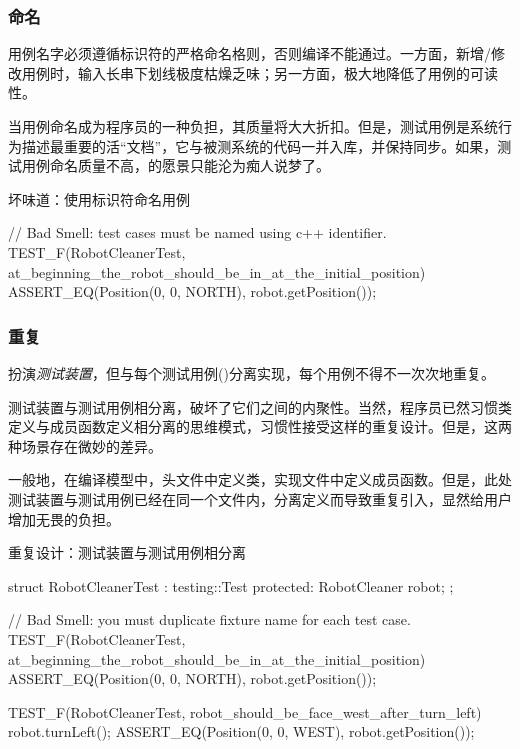 \begin{content}
\subsubsection{命名}

用例名字必须遵循标识符的严格命名格则，否则编译不能通过。一方面，新增/修改用例时，输入长串下划线极度枯燥乏味；另一方面，极大地降低了用例的可读性。

当用例命名成为程序员的一种负担，其质量将大大折扣。但是，测试用例是系统行为描述最重要的活“文档”，它与被测系统的代码一并入库，并保持同步。如果，测试用例命名质量不高，的愿景只能沦为痴人说梦了。

\begin{nodiff}{坏味道：使用标识符命名用例}
 \begin{c++}
// Bad Smell: test cases must be named using c++ identifier.
TEST_F(RobotCleanerTest, at_beginning_the_robot_should_be_in_at_the_initial_position) {
  ASSERT_EQ(Position(0, 0, NORTH), robot.getPosition());
}
 \end{c++}
\end{nodiff}

\subsubsection{重复}

扮演\emph{测试装置}，但与每个测试用例()分离实现，每个用例不得不一次次地重复。

测试装置与测试用例相分离，破坏了它们之间的内聚性。当然，程序员已然习惯类定义与成员函数定义相分离的思维模式，习惯性接受这样的重复设计。但是，这两种场景存在微妙的差异。

一般地，在\cpp{}编译模型中，头文件中定义类，实现文件中定义成员函数。但是，此处测试装置与测试用例已经在同一个文件内，分离定义而导致重复引入，显然给用户增加无畏的负担。

\begin{nodiff}{重复设计：测试装置与测试用例相分离}
 \begin{c++}
struct RobotCleanerTest : testing::Test {
protected:
  RobotCleaner robot;
};
 
// Bad Smell: you must duplicate fixture name for each test case.
TEST_F(RobotCleanerTest, at_beginning_the_robot_should_be_in_at_the_initial_position) {
  ASSERT_EQ(Position(0, 0, NORTH), robot.getPosition());
}
 
TEST_F(RobotCleanerTest, robot_should_be_face_west_after_turn_left) {
  robot.turnLeft();
  ASSERT_EQ(Position(0, 0, WEST), robot.getPosition());
}
  \end{c++}
\end{nodiff}


\end{content}
